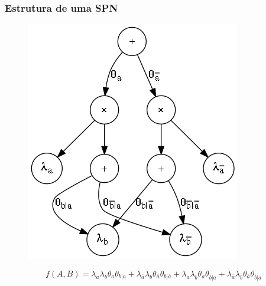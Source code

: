 \documentclass[10pt]{beamer}
\theoremstyle{plain}
\begin{document}
\begin{frame}
  \frametitle{Estrutura de uma SPN}
  \begin{figure}[h]
    \centering\includegraphics[scale=0.4]{imgs/simple_spn.png}
  \end{figure}
  \begin{equation*}
    f(A,B)=\lambda_a\lambda_b\theta_a\theta_{b|a}+\lambda_{\overline{a}}\lambda_b
    \theta_{\overline{a}}\theta_{b|\overline{a}}+\lambda_a\lambda_{\overline{b}}\theta_a
    \theta_{\overline{b}|a}+\lambda_{\overline{a}}\lambda_{\overline{b}}
    \theta_{\overline{a}}\theta_{\overline{b}|\overline{a}}
  \end{equation*}
\end{frame}
\end{document}
